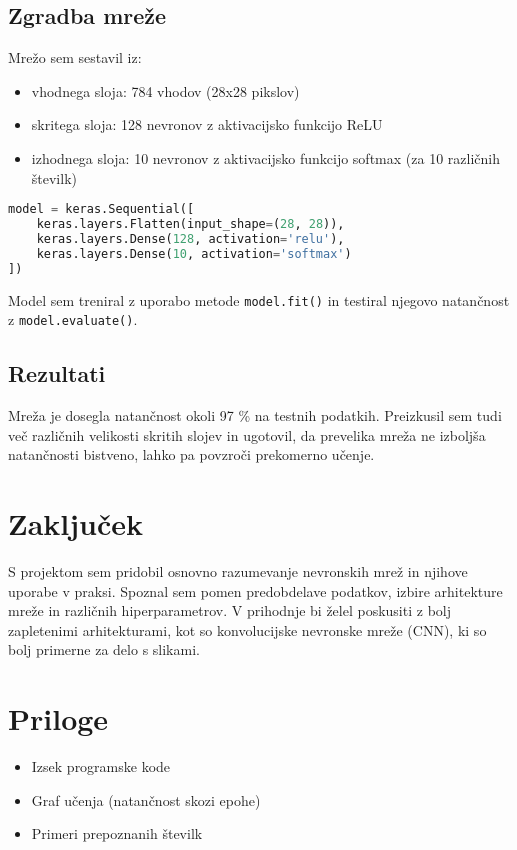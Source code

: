 \documentclass[a4paper,12pt]{article}
\begin{document}
\subsection*{Zgradba mreže}
Mrežo sem sestavil iz:
\begin{itemize}
  \item vhodnega sloja: 784 vhodov (28x28 pikslov)
  \item skritega sloja: 128 nevronov z aktivacijsko funkcijo ReLU
  \item izhodnega sloja: 10 nevronov z aktivacijsko funkcijo softmax (za 10 različnih številk)
\end{itemize}

\begin{lstlisting}[language=Python, caption=Zgradba modela v Keras]
model = keras.Sequential([
    keras.layers.Flatten(input_shape=(28, 28)),
    keras.layers.Dense(128, activation='relu'),
    keras.layers.Dense(10, activation='softmax')
])
\end{lstlisting}

Model sem treniral z uporabo metode \texttt{model.fit()} in testiral njegovo natančnost z \texttt{model.evaluate()}.

\subsection*{Rezultati}
Mreža je dosegla natančnost okoli 97 \% na testnih podatkih. Preizkusil sem tudi več različnih velikosti skritih slojev in ugotovil, da prevelika mreža ne izboljša natančnosti bistveno, lahko pa povzroči prekomerno učenje.

\section*{Zaključek}
S projektom sem pridobil osnovno razumevanje nevronskih mrež in njihove uporabe v praksi. Spoznal sem pomen predobdelave podatkov, izbire arhitekture mreže in različnih hiperparametrov. V prihodnje bi želel poskusiti z bolj zapletenimi arhitekturami, kot so konvolucijske nevronske mreže (CNN), ki so bolj primerne za delo s slikami.

\section*{Priloge}
\begin{itemize}
  \item Izsek programske kode
  \item Graf učenja (natančnost skozi epohe)
  \item Primeri prepoznanih številk
\end{itemize}
\end{document}
